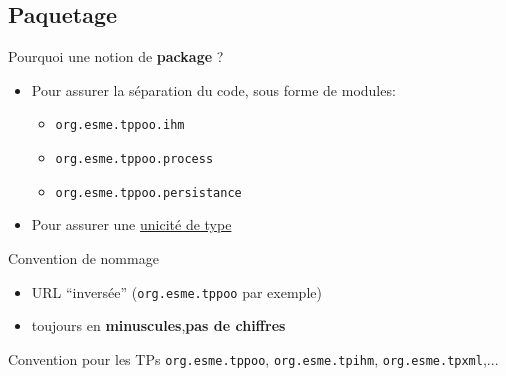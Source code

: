 \documentclass[handout]{beamer}
\begin{document}
\subsection{Paquetage}
\begin{frame}

	\begin{block}{Pourquoi une notion de \textbf{package} ?}
		\begin{itemize}
			\item Pour assurer la séparation du code, sous forme de modules:
			\begin{itemize}
			\item \texttt{org.esme.tppoo.ihm}
			\item \texttt{org.esme.tppoo.process}
			\item \texttt{org.esme.tppoo.persistance}
			\end{itemize}		
		\item Pour assurer une \underline{unicité de type}
		\end{itemize}
	\end{block}

	\begin{block}{Convention de nommage}
		\begin{itemize}
			\item URL ``inversée'' (\texttt{org.esme.tppoo} par exemple)
			\item toujours en \textbf{minuscules},\textbf{pas de chiffres}
		\end{itemize}
	\end{block}
	\begin{block}{Convention pour les TPs}
	\texttt{org.esme.tppoo}, \texttt{org.esme.tpihm}, \texttt{org.esme.tpxml},...
	\end{block}
\end{frame}
\end{document}
